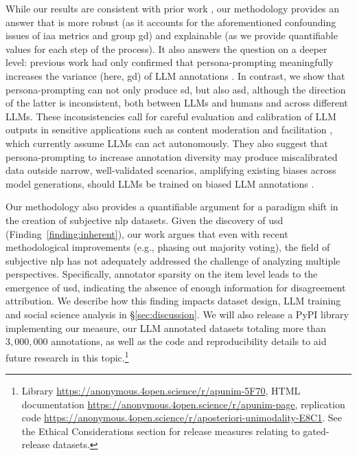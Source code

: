 \documentclass[manuscript,screen,review,anonymous]{acmart}
\theoremstyle{acmplain}
\theoremstyle{researchquestionstyle}
\newcommand{\librarylink}{\url{https://anonymous.4open.science/r/apunim-5F70}}
\newcommand{\doclink}{\url{https://anonymous.4open.science/r/apunim-page}}
\newcommand{\explink}{\url{https://anonymous.4open.science/r/aposteriori-unimodality-E8C1}}
\begin{document}
While our results are consistent with prior work \citep{lutz-etal-2025-prompt, liu-etal-2024-evaluating-large, rossi_2024, wu2026llmbasedsocialsimulationsrequire, kapania-etal-2025-examining}, our methodology provides an answer that is more robust (as it accounts for the aforementioned confounding issues of \ac{iaa} metrics and group \ac{gd}) and explainable (as we provide quantifiable values for each step of the process). It also answers the question on a deeper level: previous work had only confirmed that persona-prompting meaningfully increases the variance (here, \ac{gd}) of LLM annotations \citep{frohling-etal-2025-personas}. In contrast, we show that persona-prompting can not only produce \ac{sd}, but also \ac{asd}, although the direction of the latter is inconsistent, both between LLMs and humans and across different LLMs. These inconsistencies call for careful evaluation and calibration of LLM outputs in sensitive applications such as content moderation \citep{civelli-etal-2026-ideology} and facilitation \citep{korre-etal-2025-evaluation}, which currently assume LLMs can act autonomously. They also suggest that persona-prompting to increase annotation diversity \citep{frasheri2025persona, frohling-etal-2025-personas} may produce miscalibrated data outside narrow, well-validated scenarios, amplifying existing biases across model generations, should LLMs be trained on biased LLM annotations \citep{ren-etal-2024-bias, pmlr-v202-taori23a}.

Our methodology also provides a quantifiable argument for a paradigm shift in the creation of subjective \ac{nlp} datasets. Given the discovery of \ac{usd} (Finding~\ref{finding:inherent}), our work argues that even with recent methodological improvements (e.g., phasing out majority voting), the field of subjective \ac{nlp} has not adequately addressed the challenge of analyzing multiple perspectives. Specifically, annotator sparsity on the item level leads to the emergence of \ac{usd}, indicating the absence of enough information for disagreement attribution. We describe how this finding impacts dataset design, LLM training and social science analysis in \S\ref{sec:discussion}. We will also release a PyPI library implementing our measure, our LLM annotated datasets totaling more than $3{,}000{,}000$ annotations, as well as the code and reproducibility details to aid future research in this topic.\footnote{Library \librarylink, HTML documentation \doclink, replication code \explink. See the Ethical Considerations section for release measures relating to gated-release datasets.}
\end{document}
